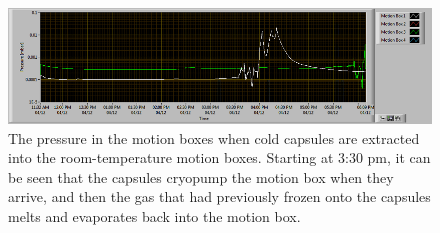 \begin{figure}
    \centering
    \includegraphics[width=0.9\linewidth]{Figures/CUORE_vacuum_cryopumping.png}
    \caption[The pressure in the motion boxes when cold capsules are extracted into the room-temperature motion boxes.]
    {The pressure in the motion boxes when cold capsules are extracted into the room-temperature motion boxes.
    Starting at 3:30 pm, it can be seen that the capsules cryopump the motion box when they arrive, and then the gas that had previously frozen onto the capsules melts and evaporates back into the motion box.}
    \label{fig:capsule_cryopumping}
\end{figure}

